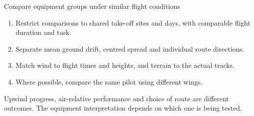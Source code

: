 \documentclass[11pt,aspectratio=169]{beamer}
\begin{document}
\begin{frame}{Compare equipment groups under similar flight conditions}
\small
\begin{enumerate}
 \item Restrict comparisons to shared take-off sites and days, with comparable
 flight duration and task.
 \item Separate mean ground drift, centred spread and individual route directions.
 \item Match wind to flight times and heights, and terrain to the actual tracks.
 \item Where possible, compare the same pilot using different wings.
\end{enumerate}
Upwind progress, air-relative performance and choice of route are different
outcomes. The equipment interpretation depends on which one is being tested.
\end{frame}
\end{document}
